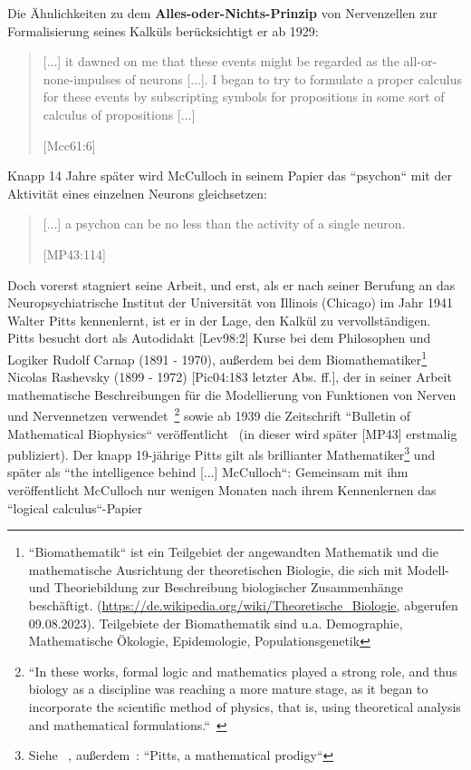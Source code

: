 Die Ähnlichkeiten zu dem \textbf{Alles-oder-Nichts-Prinzip} von Nervenzellen zur Formalisierung seines Kalküls berücksichtigt er ab 1929:

\blockquote[{[Mcc61:6]}]{
    [...] it dawned on me that these events might be regarded as the all-or-none-impulses of neurons [...]. I began to try to formulate a proper calculus for these events by subscripting symbols for propositions in some sort of calculus of propositions [...]
}

Knapp 14 Jahre später wird McCulloch in seinem Papier das ``psychon`` mit der Aktivität eines einzelnen Neurons gleichsetzen:

\blockquote[{[MP43:114]}]{
    [...] a psychon can be no less than the activity of a single neuron.
}

Doch vorerst stagniert seine Arbeit, und erst, als er nach seiner Berufung an das Neuropsychiatrische Institut der Universität von Illinois (Chicago) im Jahr 1941 Walter Pitts kennenlernt, ist er in der Lage, den Kalkül zu vervollständigen.\\

Pitts besucht dort als Autodidakt [Lev98:2] Kurse bei dem Philosophen und Logiker Rudolf Carnap (1891 - 1970), außerdem bei dem Biomathematiker\footnote{
    ``Biomathematik`` ist ein Teilgebiet der angewandten Mathematik und die mathematische Ausrichtung der theoretischen Biologie, die sich mit Modell- und Theoriebildung zur Beschreibung biologischer Zusammenhänge beschäftigt. ({\url{https://de.wikipedia.org/wiki/Theoretische\_Biologie}}, abgerufen 09.08.2023). Teilgebiete der Biomathematik sind u.a. Demographie, Mathematische Ökologie, Epidemologie, Populationsgenetik
} Nicolas Rashevsky (1899 - 1972) [Pic04:183 letzter Abs. ff.], der in seiner Arbeit mathematische Beschreibungen für die Modellierung von Funktionen von Nerven und Nervennetzen verwendet~\cite[13]{Abr02}\footnote{
    ``In these works, formal logic and mathematics played a strong role, and thus biology as a discipline was reaching a more mature stage, as it began to incorporate the scientific method of physics, that is, using theoretical analysis and mathematical formulations.``~\cite[7]{Abr02}
} sowie ab 1939 die Zeitschrift ``Bulletin of Mathematical Biophysics`` veröffentlicht~\cite[16]{Abr02} (in dieser wird später [MP43] erstmalig publiziert).
Der knapp 19-jährige Pitts gilt als brillianter Mathematiker\footnote{
    Siehe ~\cite[4]{Arb19}, außerdem~\cite[22]{Abr02}: ``Pitts, a mathematical prodigy``
} und später als ``the intelligence behind [...] McCulloch``: Gemeinsam mit ihm veröffentlicht McCulloch nur wenigen Monaten nach ihrem Kennenlernen das ``logical calculus``-Papier~\cite[104]{AR98}


